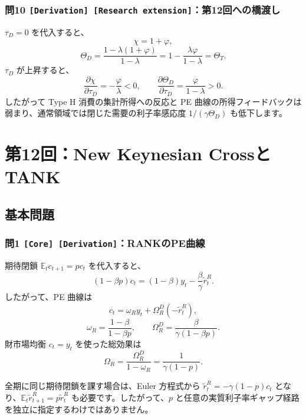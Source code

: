 \documentclass[
  japanese,
  lualatex,
  ja=standard,
  11pt,
  a4paper]{ltjsarticle}
\begin{document}
\subsubsection{\texorpdfstring{問10
\texttt{{[}Derivation{]}\ {[}Research\ extension{]}}：第12回への橋渡し}{問10 {[}Derivation{]} {[}Research extension{]}：第12回への橋渡し}}\label{ux554f10-derivation-research-extensionux7b2c12ux56deux3078ux306eux6a4bux6e21ux3057}

\(\tau_D=0\) を代入すると、 \[
\chi=1+\varphi,
\] \[
\Theta_D
=\frac{1-\lambda(1+\varphi)}{1-\lambda}
=1-\frac{\lambda\varphi}{1-\lambda}
=\Theta_T.
\] \(\tau_D\) が上昇すると、 \[
\frac{\partial\chi}{\partial\tau_D}=-\frac\varphi\lambda<0,
\qquad
\frac{\partial\Theta_D}{\partial\tau_D}=\frac\varphi{1-\lambda}>0.
\] したがって Type H 消費の集計所得への反応と PE
曲線の所得フィードバックは弱まり、通常領域では閉じた需要の利子率感応度
\(1/(\gamma\Theta_D)\) も低下します。

\clearpage

\section{第12回：New Keynesian
CrossとTANK}\label{ux7b2c12ux56denew-keynesian-crossux3068tank}

\subsection{基本問題}\label{ux57faux672cux554fux984c-11}

\subsubsection{\texorpdfstring{問1
\texttt{{[}Core{]}\ {[}Derivation{]}}：RANKのPE曲線}{問1 {[}Core{]} {[}Derivation{]}：RANKのPE曲線}}\label{ux554f1-core-derivationrankux306epeux66f2ux7dda}

期待閉鎖 \(\mathbb E_tc_{t+1}=pc_t\) を代入すると、 \[
(1-\beta p)c_t
=(1-\beta)y_t-\frac\beta\gamma\widetilde r_t^R.
\] したがって、PE 曲線は \[
c_t=\omega_Ry_t+\Omega_R^D(-\widetilde r_t^R),
\] \[
\omega_R=\frac{1-\beta}{1-\beta p},
\qquad
\Omega_R^D=\frac{\beta}{\gamma(1-\beta p)}.
\] 財市場均衡 \(c_t=y_t\) を使った総効果は \[
\Omega_R
=\frac{\Omega_R^D}{1-\omega_R}
=\frac{1}{\gamma(1-p)}.
\]

全期に同じ期待閉鎖を課す場合は、Euler 方程式から
\(\widetilde r_t^R=-\gamma(1-p)c_t\)
となり、\(\mathbb E_t\widetilde r_{t+1}^R=p\widetilde r_t^R\)
も必要です。したがって、\(p\)
と任意の実質利子率ギャップ経路を独立に指定するわけではありません。
\end{document}
